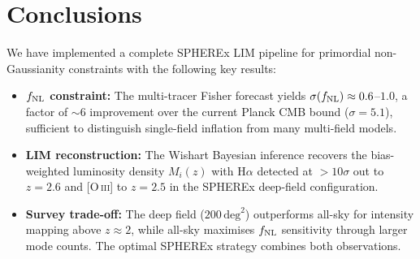 \documentclass[12pt]{article}
\begin{document}
\section{Conclusions}
\label{sec:conclusions}

We have implemented a complete SPHEREx LIM pipeline for primordial
non-Gaussianity constraints with the following key results:

\begin{itemize}
\item \textbf{$f_{\rm NL}$ constraint:} The multi-tracer Fisher forecast
  yields $\sigma(f_{\rm NL}) \approx 0.6$--$1.0$, a factor of $\sim$6
  improvement over the current Planck CMB bound ($\sigma = 5.1$), sufficient
  to distinguish single-field inflation from many multi-field models.

\item \textbf{LIM reconstruction:} The Wishart Bayesian inference recovers
  the bias-weighted luminosity density $M_i(z)$ with H$\alpha$ detected at
  $>10\sigma$ out to $z = 2.6$ and [O\,\textsc{iii}] to $z = 2.5$ in the
  SPHEREx deep-field configuration.

\item \textbf{Survey trade-off:} The deep field ($200\,\mathrm{deg}^2$)
  outperforms all-sky for intensity mapping above $z \approx 2$, while
  all-sky maximises $f_{\rm NL}$ sensitivity through larger mode counts.
  The optimal SPHEREx strategy combines both observations.
\end{itemize}



\end{document}
